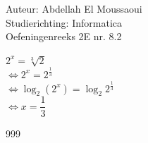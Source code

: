 \documentclass[a4paper]{article}
\begin{document}
  
\noindent \large Auteur: Abdellah El Moussaoui \\
\noindent \large Studierichting: Informatica\\
\noindent \large Oefeningenreeks 2E nr. 8.2\\

\medskip

\normalsize
$2^x = \sqrt[3]{2}$\\

$\Leftrightarrow 2^x = 2^{\tfrac{1}{3}}$\\

$\Leftrightarrow \log_2 (2^x) = \log_2 2^{\tfrac{1}{3}}$\\

$\Leftrightarrow x = \dfrac{1}{3}$\\

\begin{thebibliography}{999}
\end{thebibliography}
\end{document}
